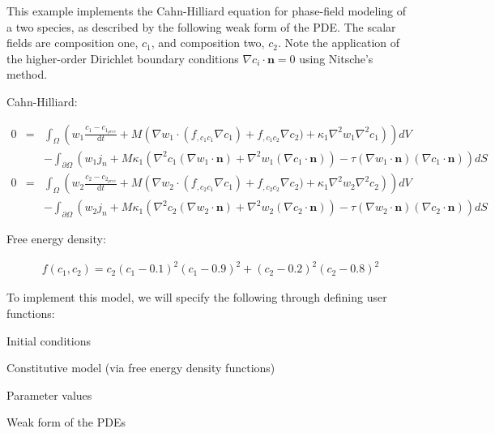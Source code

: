 

This example implements the Cahn-\/\-Hilliard equation for phase-\/field modeling of a two species, as described by the following weak form of the P\-D\-E. The scalar fields are composition one, $c_1$, and composition two, $c_2$. Note the application of the higher-\/order Dirichlet boundary conditions $\nabla c_i\cdot\boldsymbol{n}=0$ using Nitsche's method.

Cahn-\/\-Hilliard\-:

\begin{eqnarray*} 0 &=& \int_\Omega \left(w_1\frac{c_1 - c_{1_{prev}}}{\mathrm{d}t} + M\left(\nabla w_1\cdot(f_{,c_1c_1}\nabla c_1) + f_{,c_1c_2}\nabla c_2) + \kappa_1\nabla^2 w_1\nabla^2 c_1\right)\right) dV\\ &\phantom{=}& - \int_{\partial\Omega} \left(w_1j_n + M\kappa_1\left(\nabla^2c_1(\nabla w_1\cdot\boldsymbol{n}) + \nabla^2w_1(\nabla c_1\cdot\boldsymbol{n})\right) - \tau(\nabla w_1\cdot\boldsymbol{n})(\nabla c_1\cdot\boldsymbol{n})\right) dS\\ 0 &=& \int_\Omega \left(w_2\frac{c_2 - c_{2_{prev}}}{\mathrm{d}t} + M\left(\nabla w_2\cdot(f_{,c_2c_1}\nabla c_1) + f_{,c_2c_2}\nabla c_2) + \kappa_1\nabla^2 w_2\nabla^2 c_2\right)\right) dV\\ &\phantom{=}& - \int_{\partial\Omega} \left(w_2j_n + M\kappa_1\left(\nabla^2c_2(\nabla w_2\cdot\boldsymbol{n}) + \nabla^2w_2(\nabla c_2\cdot\boldsymbol{n})\right) - \tau(\nabla w_2\cdot\boldsymbol{n})(\nabla c_2\cdot\boldsymbol{n})\right) dS \end{eqnarray*}

Free energy density\-:

\begin{eqnarray*} f(c_1,c_2) = c_2(c_1-0.1)^2(c_1-0.9)^2 + (c_2-0.2)^2(c_2-0.8)^2 \end{eqnarray*}

To implement this model, we will specify the following through defining user functions\-: \par

\begin{DoxyItemize}
\item Initial conditions \par

\item Constitutive model (via free energy density functions) \par

\item Parameter values \par

\item Weak form of the P\-D\-Es \par

\end{DoxyItemize}

